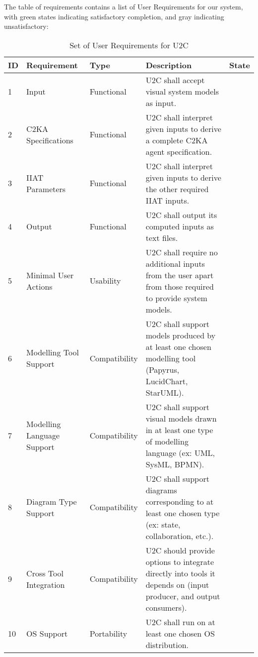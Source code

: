 \documentclass[11pt]{article}
\begin{document}
    The table of requirements contains a list of User Requirements for our system,
    with green states indicating satisfactory completion, and gray indicating unsatisfactory:
    \begin{longtable}{|l|p{2.6cm}|l|p{4.5cm}|c|}
        \caption{Set of User Requirements for U2C}
        \label{tab:user-reqs}
        \hline
        \textbf{ID} & \textbf{Requirement} & \textbf{Type}  & \textbf{Description} & \textbf{State}\\
        \hline
        \endhead
        \hline
        1 & Input & Functional & U2C shall accept visual system models as input. & \cellcolor{green!30}  \\
        \hline
        2 & C2KA Specifications & Functional & U2C shall interpret given inputs to derive a complete C2KA agent specification. & \cellcolor{green!30}  \\
        \hline
        3 & IIAT Parameters & Functional & U2C shall interpret given inputs to derive the other required IIAT inputs. & \cellcolor{gray!30}  \\
        \hline
        4 & Output & Functional & U2C shall output its computed inputs as text files. & \cellcolor{green!30}  \\
        \hline
        5 & Minimal User Actions & Usability & U2C shall require no additional inputs from the user apart from those required to provide system models. & \cellcolor{green!30}  \\
        \hline
        6 & Modelling Tool Support & Compatibility & U2C shall support models produced by at least one chosen modelling tool (Papyrus, LucidChart, StarUML). & \cellcolor{green!30}  \\
        \hline
        7 & Modelling Language Support & Compatibility & U2C shall support visual models drawn in at least one type of modelling language (ex: UML, SysML, BPMN). & \cellcolor{green!30}  \\
        \hline
        8 & Diagram Type Support & Compatibility & U2C shall support diagrams corresponding to at least one chosen type (ex: state, collaboration, etc.). & \cellcolor{green!30}  \\
        \hline
        9 & Cross Tool Integration & Compatibility & U2C should provide options to integrate directly into tools it depends on (input producer, and output consumers). & \cellcolor{gray!30}  \\
        \hline
        10 & OS Support & Portability & U2C shall run on at least one chosen OS distribution. & \cellcolor{green!30}  \\

\end{longtable}
\end{document}
